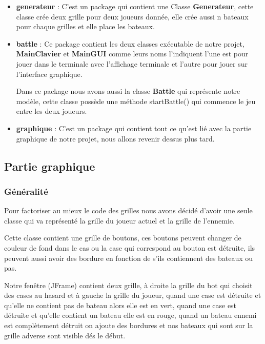 \documentclass[12pt]{article}
\begin{document}
\begin{itemize}
\item \textbf{generateur} : C'est un package qui contient une Classe \textbf{Generateur}, cette classe crée deux grille pour deux joueurs donnée, elle crée aussi n bateaux pour chaque grilles et elle place les bateaux. 

\item \textbf{battle} : Ce package contient les deux classes exécutable de notre projet, \textbf{MainClavier} et \textbf{MainGUI} comme leurs noms l'indiquent l'une est pour jouer dans le terminale avec l'affichage terminale et l'autre pour jouer sur l'interface graphique.

Dans ce package nous avons aussi la classe \textbf{Battle}  qui représente notre modèle, cette classe possède une méthode startBattle() qui commence le jeu entre les deux joueurs.

\item \textbf{graphique} : C'est un package qui contient tout ce qu'est lié avec la partie graphique de notre projet, nous allons revenir dessus plus tard.


\end{itemize}


\subsection{Partie graphique}

\subsubsection{Généralité}

Pour factoriser au mieux le code des grilles nous avons décidé d'avoir une seule classe qui va représenté la grille du joueur actuel et la grille de l'ennemie.

Cette classe contient une grille de boutons, ces boutons peuvent changer de couleur de fond dans le cas ou la case qui correspond au bouton est détruite, ils peuvent aussi avoir des bordure en fonction de s'ils contiennent des bateaux ou pas.

Notre fenêtre (JFrame) contient deux grille, à droite la grille du bot qui choisit des cases au hasard et à gauche la grille du joueur, quand une case est détruite et qu'elle ne contient pas de bateau alors elle est en vert, quand une case est détruite et qu'elle contient un bateau elle est en rouge, quand un bateau ennemi est complètement détruit on ajoute des bordures  et nos bateaux qui sont sur la grille adverse sont visible dés le début.
\end{document}
